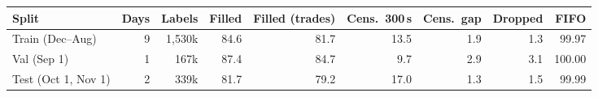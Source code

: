\begin{tabular}{lrrrrrrrr}
\toprule
Split & Days & Labels & Filled & Filled (trades) & Cens.\ 300\,s & Cens.\ gap & Dropped & FIFO \\
\midrule
Train (Dec--Aug) & 9 & 1,530k & 84.6 & 81.7 & 13.5 & 1.9 & 1.3 & 99.97 \\
Val (Sep 1) & 1 & 167k & 87.4 & 84.7 & 9.7 & 2.9 & 3.1 & 100.00 \\
Test (Oct 1, Nov 1) & 2 & 339k & 81.7 & 79.2 & 17.0 & 1.3 & 1.5 & 99.99 \\
\bottomrule
\end{tabular}
